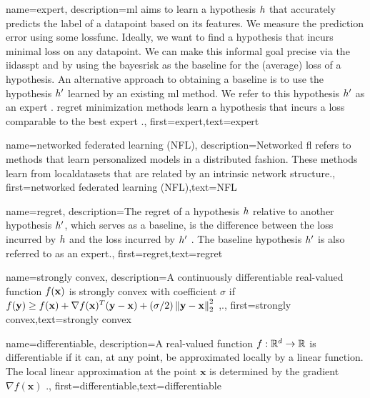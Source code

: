 {{
{name={expert},
	description={\gls{ml} aims to learn a \gls{hypothesis} $h$ that accurately predicts the \gls{label} 
		of a \gls{datapoint} based on its \gls{feature}s. We measure the \gls{prediction} error using 
		some \gls{lossfunc}. Ideally, we want to find a \gls{hypothesis} that incurs minimal \gls{loss} 
		on any \gls{datapoint}. We can make this informal goal precise via the \gls{iidasspt} 
		and by using the \gls{bayesrisk} as the \gls{baseline} for the (average) \gls{loss} of a \gls{hypothesis}. 
		An alternative approach to obtaining a \gls{baseline} is to use the \gls{hypothesis} $h'$ learned 
		by an existing \gls{ml} method. We refer to this \gls{hypothesis} $h'$ as an expert \cite{PredictionLearningGames}. \Gls{regret} minimization methods learn a \gls{hypothesis}
		that incurs a \gls{loss} comparable to the best expert \cite{PredictionLearningGames,HazanOCO}.},
	first={expert},text={expert} 
}

{name={networked federated learning (NFL)},
	description={Networked \gls{fl} refers 
		to methods that learn personalized \gls{model}s in a distributed fashion. These methods learn from \gls{localdataset}s 
		that are related by an intrinsic network structure.},
 first={networked federated learning (NFL)},text={NFL} 
}




{name={regret},
	description={The regret of a \gls{hypothesis} $h$ relative to 
		another \gls{hypothesis} $h'$, which serves as a \gls{baseline}, 
		is the difference between the \gls{loss} incurred by $h$ and the \gls{loss} 
		incurred by $h'$ \cite{PredictionLearningGames}. 
		The \gls{baseline} \gls{hypothesis} $h'$ is also referred to as an \gls{expert}.},
	first={regret},text={regret} 
}

{name={strongly convex},
	description={A continuously \gls{differentiable} real-valued 
		function $f({\bf x})$ is strongly \gls{convex} with coefficient $\sigma$ if $f({\bf y}) \geq f({\bf x}) + \nabla f({\bf x})^{T} ({\bf y} - {\bf x}) + (\sigma/2) \left\Vert {{\bf y}- {\bf x}} \right\Vert_{2}^{2}$ \cite{nesterov04},\cite[Sec. B.1.1]{CvxAlgBertsekas}.},
	first={strongly convex},text={strongly convex} 
}

{name={differentiable},
	description={A real-valued function $f: \mathbb{R}^{d} \rightarrow \mathbb{R}$ 
		is differentiable if it can, at any point, be approximated locally by a linear 
		function. The local linear approximation at the point $\mathbf{x}$ is determined 
		by the \gls{gradient} $\nabla f ( \mathbf{x})$ \cite{RudinBookPrinciplesMatheAnalysis}.},
	first={differentiable},text={differentiable} 
}

}}
